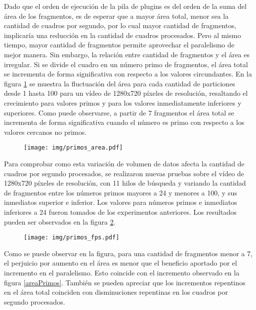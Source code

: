 Dado que el orden de ejecución de la pila de plugins es del orden de la suma del
área de los fragmentos, es de esperar que a mayor área total, menor sea la
cantidad de cuadros por segundo, por lo cual mayor cantidad de fragmentos,
implicaría una reducción en la cantidad de cuadros procesados. Pero al mismo
tiempo, mayor cantidad de fragmentos permite aprovechar el paralelismo de mejor
manera. Sin embargo, la relación entre cantidad de fragmentos y el área es
irregular. Si se divide el cuadro en un número primo de fragmentos, el área
total se incrementa de forma significativa con respecto a los valores
circundantes. En la figura \ref{primosArea} se muestra la fluctuación del área
para cada cantidad de particiones desde 1 hasta 100 para un vídeo de 1280x720
píxeles de resolución, resaltando el crecimiento para valores primos y para los
valores inmediatamente inferiores y superiores. Como puede observarse, a partir
de 7 fragmentos el área total se incrementa de forma significativa cuando el
número es primo con respecto a los valores cercanos no primos.

\begin{figure}[!h]

	\texttt{[image: img/primos\_area.pdf]}
	\caption{}
	\label{primosArea}

\end{figure}

Para comprobar como esta variación de volumen de datos afecta la cantidad de
cuadros por segundo procesados, se realizaron nuevas pruebas sobre el vídeo de
1280x720 píxeles de resolución, con 11 hilos de búsqueda y variando la cantidad
de fragmentos entre los números primos mayores a 24 y menores a 100, y sus
inmediatos superior e inferior. Los valores para números primos e inmediatos
inferiores a 24 fueron tomados de los experimentos anteriores. Los resultados
pueden ser observados en la figura \ref{primosFPS}.

\begin{figure}[!h]

	\texttt{[image: img/primos\_fps.pdf]}
	\caption{}
	\label{primosFPS}

\end{figure}

Como se puede observar en la figura, para una cantidad de fragmentos menor a 7,
el perjuicio por aumento en el área es menor que el beneficio aportado por el
incremento en el paralelismo. Esto coincide con el incremento observado en la
figura \ref{areaPrimos}. También se pueden apreciar que los incrementos
repentinos en el área total coinciden con disminuciones repentinas en los
cuadros por segundo procesados.

